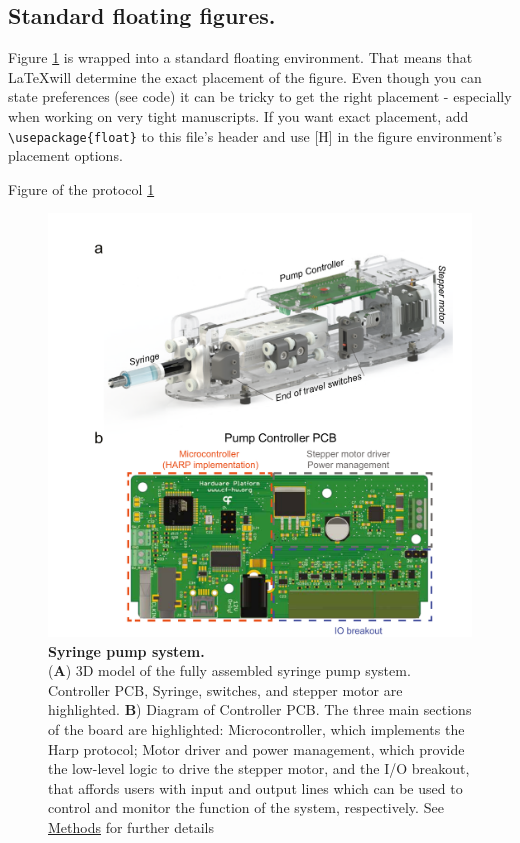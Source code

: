\subsection*{Standard floating figures.}
Figure \ref{fig:PumpDrawing} is wrapped into a standard floating environment. That means that \LaTeX will determine the exact placement of the figure. Even though you can state preferences (see code) it can be tricky to get the right placement - especially when working on very tight manuscripts. If you want exact placement, add \verb!\usepackage{float}! to this file's header and use [H] in the figure environment's placement options.

Figure of the protocol \ref{fig:PumpDrawing}

\begin{figure}
	\centering
	\includegraphics[width=1.0\linewidth]{Figures/Artboard 1.pdf}
	\caption{\textbf{Syringe pump system.}\\
		(\textbf{A}) 3D model of the fully assembled syringe pump system. Controller PCB, Syringe, switches, and stepper motor are highlighted.  \textbf{B}) Diagram of Controller PCB. The three main sections of the board are highlighted: Microcontroller, which implements the Harp protocol; Motor driver and power management, which provide the low-level logic to drive the stepper motor, and the I/O breakout, that affords users with input and output lines which can be used to control and monitor the function of the system, respectively. See  \hyperref[s:methods]{Methods} for further details}
	\label{fig:PumpDrawing}
\end{figure}



